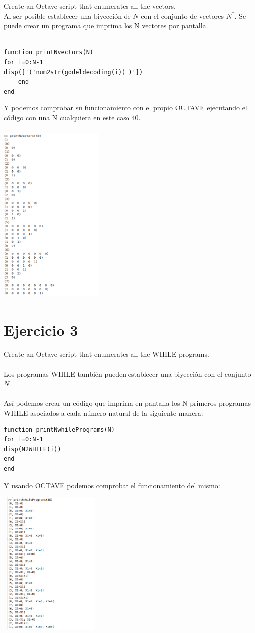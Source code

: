 \documentclass[fleqn, 10pt]{article}
\theoremstyle{plain}
\theoremstyle{definition}
\begin{document}
Create an Octave script that enumerates all the vectors.
\\

Al ser posible establecer una biyección de $N$ con el conjunto de vectores $N^*$. Se puede crear un programa que imprima los N vectores por pantalla.


\begin{verbatim}

function printNvectors(N)
for i=0:N-1
disp(['('num2str(godeldecoding(i))')'])
	end
end
\end{verbatim}

Y podemos comprobar su funcionamiento con el propio OCTAVE ejecutando el código con una N cualquiera en este caso 40.


\begin{center}
\includegraphics[width=5cm, height=9cm]{4.png}
\end{center}

\section{Ejercicio 3}
Create an Octave script that enumerates all the WHILE programs.
\\
\\
Los programas WHILE también pueden establecer una biyección con el conjunto $N$
\\ 
\\
Así podemos crear un código que imprima en pantalla los N primeros programas WHILE asociados a cada número natural de la siguiente manera:

\begin{verbatim}
function printNwhilePrograms(N)
for i=0:N-1
disp(N2WHILE(i))
end
end
\end{verbatim}

Y usando OCTAVE podemos comprobar el funcionamiento del mismo:
\begin{center}
\includegraphics[width=5cm, height=7cm]{5.png}
\end{center}
\end{document}
